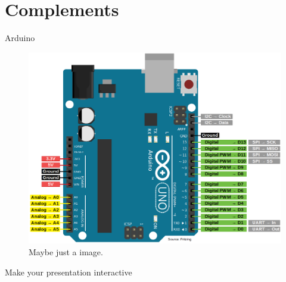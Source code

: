 \section{Complements}

\begin{frame}{Arduino}

    \begin{figure}
        \centering
        \includegraphics[height = 0.5\textheight]{img/uno.png}
        \caption{Maybe just a image.}
    \end{figure}

\end{frame}

\begin{frame}{Make your presentation interactive}
    \begin{cublock}
        \begin{overlayarea}{\textwidth}{\baselineskip}
        \end{overlayarea}
    \end{cublock}
\end{frame}
